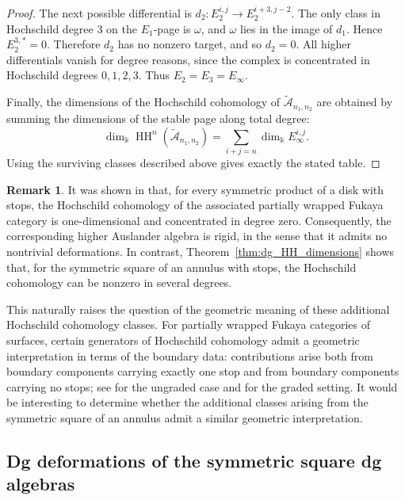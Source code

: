 \documentclass[a4paper, reqno, 11pt]{amsart}
\theoremstyle{definition}
\newtheorem{remark}[theorem]{Remark}
\begin{document}
\begin{proof}
	The next possible differential is \(d_2:E_2^{i,j}\longrightarrow E_2^{i+3,j-2}.\)
	The only class in Hochschild degree \(3\) on the \(E_1\)-page is \(\omega\), and
	\(\omega\) lies in the image of \(d_1\). Hence \(E_2^{3,*}=0.\) Therefore \(d_2\) has no nonzero target, and so \(d_2=0\). All higher
	differentials vanish for degree reasons, since the complex is concentrated in
	Hochschild degrees \(0,1,2,3\). Thus \(E_2=E_3=E_\infty.\)
	
	Finally, the dimensions of the Hochschild cohomology of
	\(\widetilde{\mathcal A}_{n_1,n_2}\) are obtained by summing the dimensions of
	the stable page along total degree:
	\[
	\dim_{\Bbbk} \operatorname{HH}^n(\widetilde{\mathcal A}_{n_1,n_2})
	=\sum\limits_{i+j=n}\dim_{\Bbbk} E_\infty^{i,j}.
	\]
	Using the surviving classes described above gives exactly the stated table.
\end{proof}


\begin{remark}
	It was shown in \cite{schrollsolotarwen} that, for every symmetric product of a disk with stops, the Hochschild cohomology of the associated partially wrapped Fukaya category is one-dimensional and concentrated in degree zero. Consequently, the corresponding higher Auslander algebra is rigid, in the sense that it admits no nontrivial deformations. In contrast, Theorem~\ref{thm:dg_HH_dimensions} shows that, for the symmetric square of an annulus with stops, the Hochschild cohomology can be nonzero in several degrees.
	
	This naturally raises the question of the geometric meaning of these additional Hochschild cohomology classes. For partially wrapped Fukaya categories of surfaces, certain generators of Hochschild cohomology admit a geometric interpretation in terms of the boundary data: contributions arise both from boundary components carrying exactly one stop and from boundary components carrying no stops; see \cite{Chaparro-Schroll-Solotar-SuarezAlvarez2026} for the ungraded case and \cite{Bian-Schroll-Solotar-Wang-Wen2026} for the graded setting. It would be interesting to determine whether the additional classes arising from the symmetric square of an annulus admit a similar geometric interpretation. 
\end{remark}


\subsection{Dg deformations of the symmetric square dg algebras}\label{deformed-alg}
\end{document}
